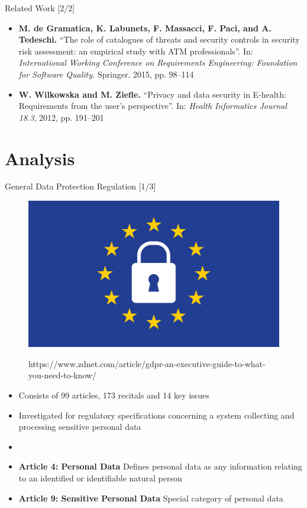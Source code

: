 \documentclass[xcolor=table]{beamer}
\begin{document}
\begin{frame}{Related Work [2/2]}
\begin{itemize}
    \item \textbf{M. de Gramatica, K. Labunets, F. Massacci, F. Paci, and A. Tedeschi.} “The role of catalogues of threats and security controls in security risk assessment: an empirical study with ATM professionals”. In: \textit{International Working Conference on Requirements Engineering: Foundation for Software Quality.} Springer. 2015, pp. 98–114 \cite{cataloguerole}
    \item \textbf{W. Wilkowska and M. Ziefle.} “Privacy and data security in E-health: Requirements from the user’s perspective”. In: \textit{Health Informatics Journal 18.3}, 2012, pp. 191–201 \cite{wilkowska2012privacy}
\end{itemize}
\end{frame}


\section{Analysis}
\begin{frame}{General Data Protection Regulation [1/3]}
 \begin{figure}[H]
  \includegraphics[width=0.3\linewidth]{img/gdpr.jpg}
  \label{fig:gdpr}
  \captionsetup{labelformat=empty}
  \caption{https://www.zdnet.com/article/gdpr-an-executive-guide-to-what-you-need-to-know/}
\end{figure}
\begin{itemize}
    \item Consists of 99 articles, 173 recitals and 14 key issues \cite{GDPR}
    \item Investigated for regulatory specifications concerning a system collecting and processing sensitive personal data
\end{itemize}
\begin{itemize}[label={}]
    \item
    \item{\textbf{Article 4: Personal Data}}  Defines personal data as any information relating to an identified or identifiable natural person \cite{GDPR4}
    \item{\textbf{Article 9: Sensitive Personal Data}}  Special category of personal data \cite{GDPR9}
\end{itemize}
\end{frame}
\end{document}

